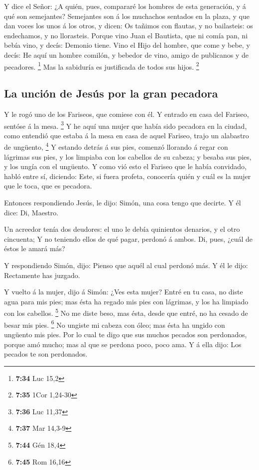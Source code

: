  Y dice el Señor: ¿A quién, pues, compararé los hombres de
esta generación, y á qué son semejantes?  Semejantes son á
los muchachos sentados en la plaza, y que dan voces los unos á los
otros, y dicen: Os tañimos con flautas, y no bailasteis: os endechamos,
y no llorasteis.  Porque vino Juan el Bautista, que ni
comía pan, ni bebía vino, y decís: Demonio tiene.  Vino el
Hijo del hombre, que come y bebe, y decís: He aquí un hombre comilón, y
bebedor de vino, amigo de publicanos y de pecadores. \footnote{\textbf{7:34}
  Luc 15,2}  Mas la sabiduría es justificada de todos sus
hijos. \footnote{\textbf{7:35} 1Cor 1,24-30}

\hypertarget{la-unciuxf3n-de-jesuxfas-por-la-gran-pecadora}{%
\subsection{La unción de Jesús por la gran
pecadora}\label{la-unciuxf3n-de-jesuxfas-por-la-gran-pecadora}}

 Y le rogó uno de los Fariseos, que comiese con él. Y
entrado en casa del Fariseo, sentóse á la mesa. \footnote{\textbf{7:36}
  Luc 11,37}  Y he aquí una mujer que había sido pecadora
en la ciudad, como entendió que estaba á la mesa en casa de aquel
Fariseo, trajo un alabastro de ungüento, \footnote{\textbf{7:37} Mar
  14,3-9}  Y estando detrás á sus pies, comenzó llorando á
regar con lágrimas sus pies, y los limpiaba con los cabellos de su
cabeza; y besaba sus pies, y los ungía con el ungüento.  Y
como vió esto el Fariseo que le había convidado, habló entre sí,
diciendo: Este, si fuera profeta, conocería quién y cuál es la mujer que
le toca, que es pecadora.

 Entonces respondiendo Jesús, le dijo: Simón, una cosa
tengo que decirte. Y él dice: Di, Maestro.

 Un acreedor tenía dos deudores: el uno le debía quinientos
denarios, y el otro cincuenta;  Y no teniendo ellos de qué
pagar, perdonó á ambos. Di, pues, ¿cuál de éstos le amará más?

 Y respondiendo Simón, dijo: Pienso que aquél al cual
perdonó más. Y él le dijo: Rectamente has juzgado.

 Y vuelto á la mujer, dijo á Simón: ¿Ves esta mujer? Entré
en tu casa, no diste agua para mis pies; mas ésta ha regado mis pies con
lágrimas, y los ha limpiado con los cabellos. \footnote{\textbf{7:44}
  Gén 18,4}  No me diste beso, mas ésta, desde que entré,
no ha cesado de besar mis pies. \footnote{\textbf{7:45} Rom 16,16}
 No ungiste mi cabeza con óleo; mas ésta ha ungido con
ungüento mis pies.  Por lo cual te digo que sus muchos
pecados son perdonados, porque amó mucho; mas al que se perdona poco,
poco ama.  Y á ella dijo: Los pecados te son perdonados.

